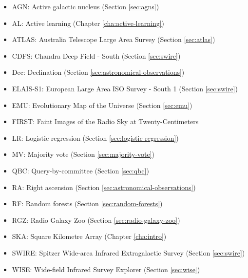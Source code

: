   \begin{itemize}
    \item AGN: Active galactic nucleus (Section \ref{sec:agns})
    \item AL: Active learning (Chapter \ref{cha:active-learning})
    \item ATLAS: Australia Telescope Large Area Survey (Section \ref{sec:atlas})
    \item CDFS: Chandra Deep Field - South (Section \ref{sec:swire})
    \item Dec: Declination (Section \ref{sec:astronomical-observations})
    \item ELAIS-S1: European Large Area ISO Survey - South 1 (Section \ref{sec:swire})
    \item EMU: Evolutionary Map of the Universe (Section \ref{sec:emu})
    \item FIRST: Faint Images of the Radio Sky at Twenty-Centimeters
    \item LR: Logistic regression (Section \ref{sec:logistic-regression})
    \item MV: Majority vote (Section \ref{sec:majority-vote})
    \item QBC: Query-by-committee (Section \ref{sec:qbc})
    \item RA: Right ascension (Section \ref{sec:astronomical-observations})
    \item RF: Random forests (Section \ref{sec:random-forests})
    \item RGZ: Radio Galaxy Zoo (Section \ref{sec:radio-galaxy-zoo})
    \item SKA: Square Kilometre Array (Chapter \ref{cha:intro})
    \item SWIRE: Spitzer Wide-area Infrared Extragalactic Survey (Section \ref{sec:swire})
    \item WISE: Wide-field Infrared Survey Explorer (Section \ref{sec:wise})
  \end{itemize}
